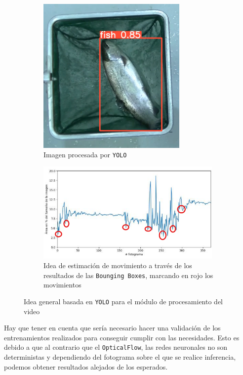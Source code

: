 \begin{enumerate}
    \begin{figure}[H]
        \centering
        \begin{subfigure}[t]{0.39\textwidth}
            \centering
            \includegraphics[width=0.8\textwidth]{images/6/EjemploYOLO.png}
            \caption{Imagen procesada por \texttt{YOLO}}
        \end{subfigure}
        \begin{subfigure}[t]{0.59\textwidth}
            \centering
            \includegraphics[width=0.99\textwidth]{images/6/YOLOEjemploResultados.png}
            \caption{Idea de estimación de movimiento a través de los resultados de las \texttt{Bounging Boxes}, marcando en rojo los movimientos}
        \end{subfigure}
        \caption{Idea general basada en \texttt{YOLO} para el módulo de procesamiento del video}
        \label{fig:IdeaYOLOGeneral}
    \end{figure}

    Hay que tener en cuenta que sería necesario hacer una validación de los entrenamientos realizados para conseguir cumplir con las necesidades. 
    Esto es debido a que al contrario que el \texttt{OpticalFlow}, las redes neuronales no son deterministas y dependiendo del fotograma sobre el que se realice inferencia, 
    podemos obtener resultados alejados de los esperados.
\end{enumerate}

